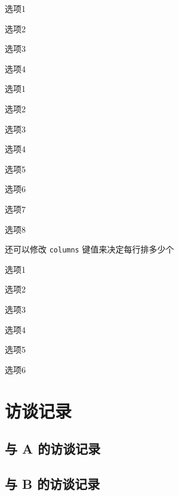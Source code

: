 \begin{choices}[label = \Roman*-]
  \item 选项1
  \item 选项2
  \item 选项3
  \item 选项4
\end{choices}

\begin{choices}[label = \circlednumber*]
  \item 选项1
  \item 选项2
  \item 选项3
  \item 选项4
  \item 选项5
  \item 选项6
  \item 选项7
  \item 选项8
\end{choices}


还可以修改 \verb|columns| 键值来决定每行排多少个
\begin{choices}[
  columns = 3,            %
  label = (\arabic*)      %
]
  \item 选项1
  \item 选项2
  \item 选项3
  \item 选项4
  \item 选项5
  \item 选项6
\end{choices}



\chapter{访谈记录}


\section{与 A 的访谈记录}

\section{与 B 的访谈记录}